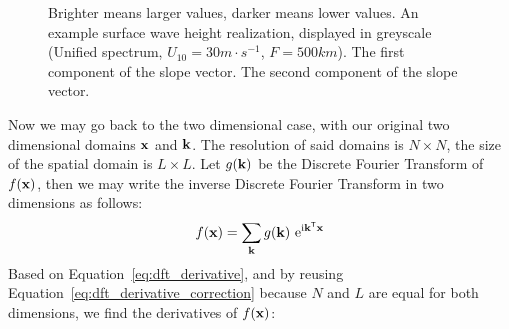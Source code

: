 \begin{figure}
{ }
 \hfill
\caption{Brighter means larger values, darker means lower values.
 An example
surface wave height realization, displayed in greyscale (Unified spectrum, 
$U_{10}=30m\cdot s^{-1}$, $F=500km$).  The 
first component of the slope vector.  The 
second component of the slope vector.
}
\label{fig:derivatives}
\end{figure}
%
Now we may go back to the two dimensional case, with our original two dimensional
domains $\mathbf{x}$ and $\mathbf{k}$. The resolution of said domains is $N \times N$,
the size of the spatial domain is $L \times L$. Let $g(\mathbf{k})$ be the Discrete
Fourier Transform of $f(\mathbf{x})$, then we may write the inverse Discrete Fourier
Transform in two dimensions as follows:
\begin{equation*}
 f(\mathbf{x}) = \sum_{\mathbf{k}}g(\mathbf{k})~\mathrm{e}^{\mathrm{i}\mathbf{k}^{\mathsf{T}}\mathbf{x}}
\end{equation*}
Based on Equation~\ref{eq:dft_derivative}, and by reusing Equation~\ref{eq:dft_derivative_correction}
because $N$ and $L$ are equal for both dimensions, we find the derivatives of $f(\mathbf{x})$:
